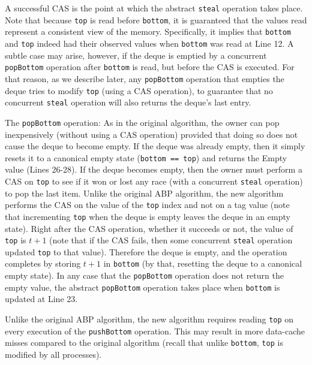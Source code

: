 A successful CAS is the point at which the abstract \lstinline!steal!
operation takes place. Note that because \lstinline!top! is read
before \lstinline!bottom!, it is guaranteed that the values read
represent a consistent view of the memory. Specifically, it implies
that \lstinline!bottom! and \lstinline!top! indeed had their observed
values when \lstinline!bottom! was read at Line 12. A subtle case may
arise, however, if the deque is emptied by a concurrent
\lstinline!popBottom! operation after \lstinline!bottom! is read, but
before the CAS is executed. For that reason, as we describe later, any
\lstinline!popBottom! operation that empties the deque tries to modify
\lstinline!top! (using a CAS operation), to guarantee that no
concurrent \lstinline!steal! operation will also returns the deque's
last entry.

The \lstinline!popBottom! operation: As in the original algorithm, the
owner can pop inexpensively (without using a CAS operation) provided
that doing so does not cause the deque to become empty. If the deque
was already empty, then it simply resets it to a canonical empty state
(\lstinline!bottom == top!) and returns the Empty value
(Lines 26-28). If the deque becomes empty, then the owner must perform
a CAS on \lstinline!top! to see if it won or lost any race (with a
concurrent \lstinline!steal! operation) to pop the last item. Unlike
the original ABP algorithm, the new algorithm performs the CAS on the
value of the \lstinline!top! index and not on a tag value (note that
incrementing \lstinline!top! when the deque is empty leaves the deque
in an empty state). Right after the CAS operation, whether it succeeds
or not, the value of \lstinline!top! is $t + 1$ (note that if the CAS
fails, then some concurrent \lstinline!steal! operation updated
\lstinline!top! to that value). Therefore the deque is empty, and the
operation completes by storing $t + 1$ in \lstinline!bottom! (by that,
resetting the deque to a canonical empty state). In any case that the
\lstinline!popBottom! operation does not return the empty value, the
abstract \lstinline!popBottom! operation takes place when
\lstinline!bottom! is updated at Line 23.


Unlike the original ABP algorithm, the new algorithm requires reading
\lstinline!top! on every execution of the \lstinline!pushBottom!
operation. This may result in more data-cache misses compared to the
original algorithm (recall that unlike \lstinline!bottom!,
\lstinline!top! is modified by all processes).


